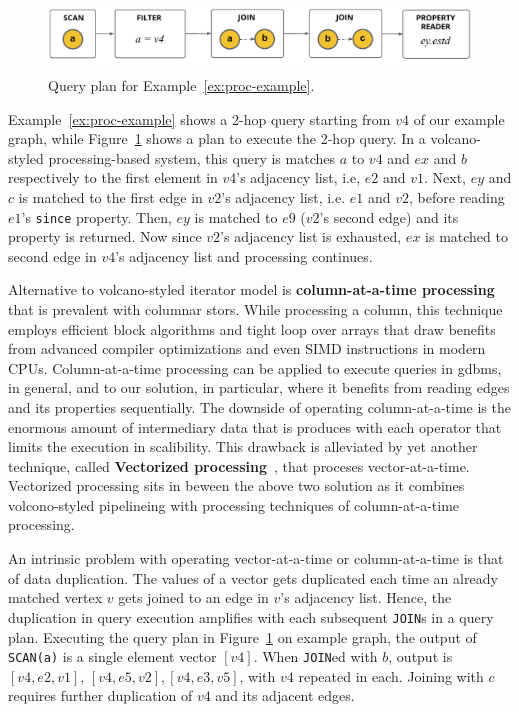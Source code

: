 \begin{figure}
	\begin{center}
		\includegraphics[scale=0.78]{img/proc-qp}
	\end{center}
		\caption{Query plan for Example~\ref{ex:proc-example}.}
	\label{fig:proc-qp}
\end{figure}

Example~\ref{ex:proc-example} shows a 2-hop query starting from $v4$ of our example graph, while Figure~\ref{fig:proc-qp} shows a plan to execute the 2-hop query. In a volcano-styled processing-based system, this query is matches $a$ to $v4$ and $ex$ and $b$ respectively to the first element in $v4$'s adjacency list, i.e, $e2$ and $v1$. Next, $ey$ and $c$ is matched to the first edge in $v2$'s adjacency list, i.e. $e1$ and $v2$, before reading $e1$'s \texttt{since} property. Then, $ey$ is matched to $e9$ ($v2$'s second edge) and its property is returned. Now since $v2$'s adjacency list is exhausted, $ex$ is matched to second edge in $v4$'s adjacency list and processing continues. 

Alternative to volcano-styled iterator model is \textbf{column-at-a-time processing}~\cite{boncz-phd, monet-2decades} that is prevalent with columnar stors. While processing a column, this technique employs efficient block algorithms and tight loop over arrays that draw benefits from advanced compiler optimizations and even SIMD instructions in modern CPUs. Column-at-a-time processing can be applied to execute queries in \gls{gdbms}, in general, and to our solution, in particular, where it benefits from reading edges and its properties sequentially. The downside of operating column-at-a-time is the enormous amount of intermediary data that is produces with each operator that limits the execution in scalibility. This drawback is alleviated by yet another technique, called \textbf{Vectorized processing}~\cite{boncz-vectorwise1, boncz-monet-vectorized, boncz-vectorwise, dbms-cache}, that proceses vector-at-a-time. Vectorized processing sits in beween the above two solution as it combines volcono-styled pipelineing with processing techniques of column-at-a-time processing. 

An intrinsic problem with operating vector-at-a-time or column-at-a-time is that of data duplication. The values of a vector gets duplicated each time an already matched vertex $v$ gets joined to an edge in $v$'s adjacency list. Hence, the duplication in query execution amplifies with each subsequent \texttt{JOIN}s in a query plan. Executing the query plan in Figure~\ref{fig:proc-qp} on example graph, the output of \texttt{SCAN(a)} is a single element vector $[v4]$. When \texttt{JOIN}ed with $b$, output is $[v4, e2, v1]$, $[v4, e5, v2], [v4, e3, v5]$, with $v4$ repeated in each. Joining with $c$ requires further duplication of $v4$ and its adjacent edges.

